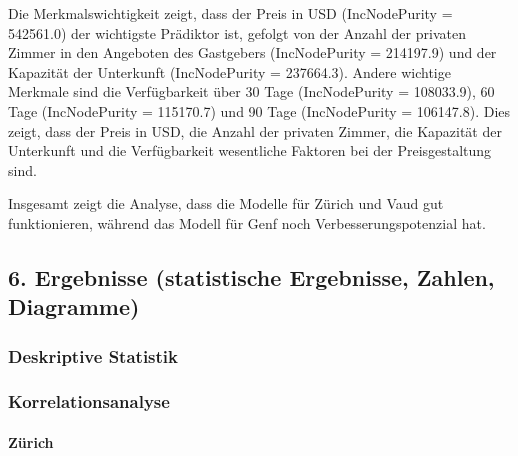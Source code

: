 \documentclass[
  journal,
]{IEEEtran}%
\let\oldparagraph\paragraph
\renewcommand{\paragraph}[1]{\oldparagraph{#1}\mbox{}}
\begin{document}
Die Merkmalswichtigkeit zeigt, dass der Preis in USD (IncNodePurity =
542561.0) der wichtigste Prädiktor ist, gefolgt von der Anzahl der
privaten Zimmer in den Angeboten des Gastgebers (IncNodePurity =
214197.9) und der Kapazität der Unterkunft (IncNodePurity = 237664.3).
Andere wichtige Merkmale sind die Verfügbarkeit über 30 Tage
(IncNodePurity = 108033.9), 60 Tage (IncNodePurity = 115170.7) und 90
Tage (IncNodePurity = 106147.8). Dies zeigt, dass der Preis in USD, die
Anzahl der privaten Zimmer, die Kapazität der Unterkunft und die
Verfügbarkeit wesentliche Faktoren bei der Preisgestaltung sind.

Insgesamt zeigt die Analyse, dass die Modelle für Zürich und Vaud gut
funktionieren, während das Modell für Genf noch Verbesserungspotenzial
hat.

\hypertarget{ergebnisse-statistische-ergebnisse-zahlen-diagramme}{%
\subsection{6. Ergebnisse (statistische Ergebnisse, Zahlen,
Diagramme)}\label{ergebnisse-statistische-ergebnisse-zahlen-diagramme}}

\hypertarget{deskriptive-statistik-1}{%
\subsubsection{\texorpdfstring{\textbf{Deskriptive
Statistik}}{Deskriptive Statistik}}\label{deskriptive-statistik-1}}

\hypertarget{korrelationsanalyse-1}{%
\subsubsection{\texorpdfstring{\textbf{Korrelationsanalyse}}{Korrelationsanalyse}}\label{korrelationsanalyse-1}}

\hypertarget{zuxfcrich}{%
\paragraph{Zürich}\label{zuxfcrich}}
\end{document}
